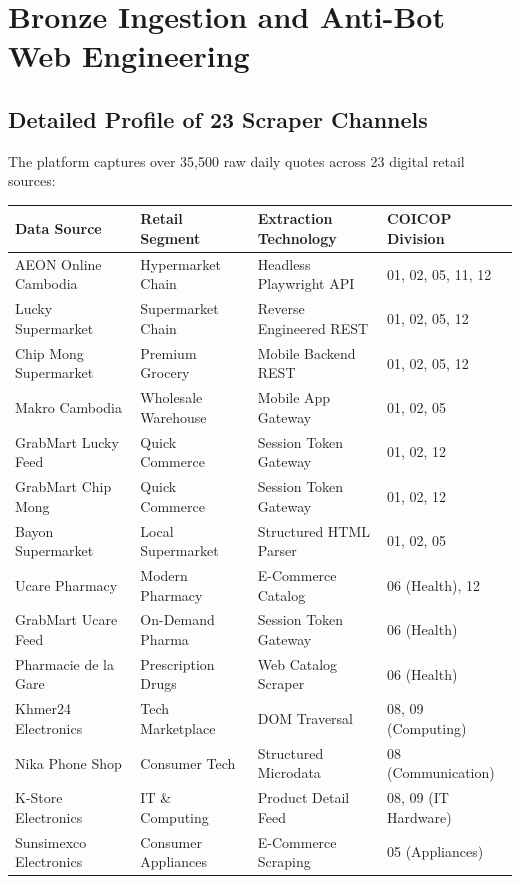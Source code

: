 \documentclass[11pt,a4paper,oneside]{article}
\begin{document}
\section{Bronze Ingestion and Anti-Bot Web Engineering}

\subsection{Detailed Profile of 23 Scraper Channels}
The platform captures over 35,500 raw daily quotes across 23 digital retail sources:

\begin{longtable}{p{4.2cm}p{3.2cm}p{3.0cm}p{3.8cm}}
\toprule
\textbf{Data Source} & \textbf{Retail Segment} & \textbf{Extraction Technology} & \textbf{COICOP Division} \\
\midrule
\endhead
AEON Online Cambodia & Hypermarket Chain & Headless Playwright API & 01, 02, 05, 11, 12 \\
Lucky Supermarket & Supermarket Chain & Reverse Engineered REST & 01, 02, 05, 12 \\
Chip Mong Supermarket & Premium Grocery & Mobile Backend REST & 01, 02, 05, 12 \\
Makro Cambodia & Wholesale Warehouse & Mobile App Gateway & 01, 02, 05 \\
GrabMart Lucky Feed & Quick Commerce & Session Token Gateway & 01, 02, 12 \\
GrabMart Chip Mong & Quick Commerce & Session Token Gateway & 01, 02, 12 \\
Bayon Supermarket & Local Supermarket & Structured HTML Parser & 01, 02, 05 \\
Ucare Pharmacy & Modern Pharmacy & E-Commerce Catalog & 06 (Health), 12 \\
GrabMart Ucare Feed & On-Demand Pharma & Session Token Gateway & 06 (Health) \\
Pharmacie de la Gare & Prescription Drugs & Web Catalog Scraper & 06 (Health) \\
Khmer24 Electronics & Tech Marketplace & DOM Traversal & 08, 09 (Computing) \\
Nika Phone Shop & Consumer Tech & Structured Microdata & 08 (Communication) \\
K-Store Electronics & IT \& Computing & Product Detail Feed & 08, 09 (IT Hardware) \\
Sunsimexco Electronics & Consumer Appliances & E-Commerce Scraping & 05 (Appliances) \\

\end{longtable}
\end{document}
